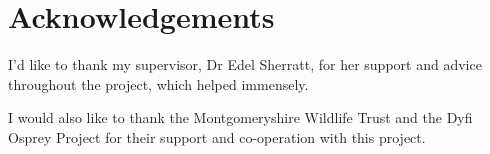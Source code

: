 \thispagestyle{empty}


\section*{\centering Acknowledgements}


I'd like to thank my supervisor, Dr Edel Sherratt, for her support and advice throughout the project, which helped immensely.

I would also like to thank the Montgomeryshire Wildlife Trust and the Dyfi Osprey Project for their support and co-operation with this project.

